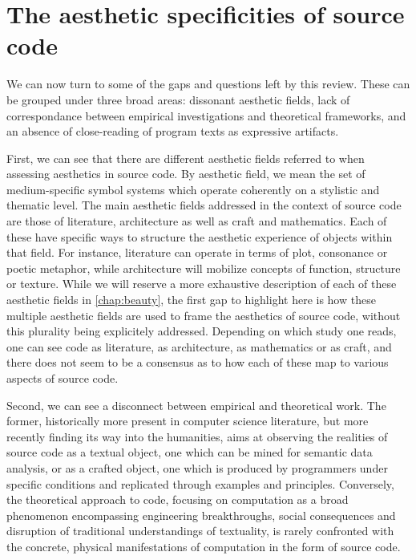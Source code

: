 \section{The aesthetic specificities of source code}
\label{sec:aesthetic-specificities-code}

We can now turn to some of the gaps and questions left by this review. These can be grouped under three broad areas: dissonant aesthetic fields, lack of correspondance between empirical investigations and theoretical frameworks, and an absence of close-reading of program texts as expressive artifacts.

First, we can see that there are different aesthetic fields referred to when assessing aesthetics in source code. By aesthetic field, we mean the set of medium-specific symbol systems which operate coherently on a stylistic and thematic level. The main aesthetic fields addressed in the context of source code are those of literature, architecture as well as craft and mathematics. Each of these have specific ways to structure the aesthetic experience of objects within that field. For instance, literature can operate in terms of plot, consonance or poetic metaphor, while architecture will mobilize concepts of function, structure or texture. While we will reserve a more exhaustive description of each of these aesthetic fields in \ref{chap:beauty}, the first gap to highlight here is how these multiple aesthetic fields are used to frame the aesthetics of source code, without this plurality being explicitely addressed. Depending on which study one reads, one can see code as literature, as architecture, as mathematics or as craft, and there does not seem to be a consensus as to how each of these map to various aspects of source code.

Second, we can see a disconnect between empirical and theoretical work. The former, historically more present in computer science literature, but more recently finding its way into the humanities, aims at observing the realities of source code as a textual object, one which can be mined for semantic data analysis, or as a crafted object, one which is produced by programmers under specific conditions and replicated through examples and principles. Conversely, the theoretical approach to code, focusing on computation as a broad phenomenon encompassing engineering breakthroughs, social consequences and disruption of traditional understandings of textuality, is rarely confronted with the concrete, physical manifestations of computation in the form of source code.

